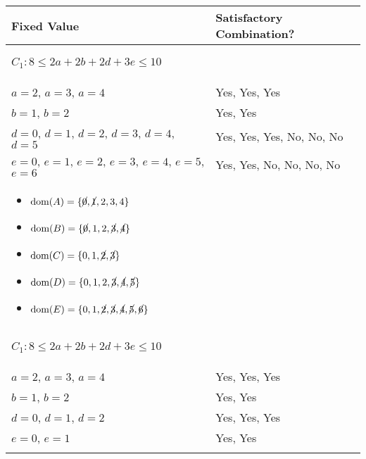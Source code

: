 \begin{example}
    \begin{center}
        \begin{tabular}{ll}
            \textbf{Fixed Value} & \textbf{Satisfactory Combination?} \\
            \toprule
            \multicolumn{2}{p{\linewidth}}{
            \begin{center}
                $C_1: 8 \leq 2a + 2b + 2d + 3e \leq 10$
            \end{center}} \\
            \midrule
                $a=2$, $a=3$, $a=4$ & Yes, Yes, Yes \\
                $b=1$, $b=2$ & Yes, Yes \\
                $d=0$, $d=1$, $d=2$, $d=3$, $d=4$, $d=5$ & Yes, Yes, Yes, No, No, No \\
                $e=0$, $e=1$, $e=2$, $e=3$, $e=4$, $e=5$, $e=6$ & Yes, Yes, No, No, No, No \\
            \multicolumn{2}{p{\linewidth}}{
            \begin{itemize}
                \item $\text{dom}(A) = \{\cancel{0}, \cancel{1}, 2, 3, 4\}$
                \item $\text{dom}(B) = \{\cancel{0}, 1, 2, \cancel{3}, \cancel{4}\} $
                \item $\text{dom}(C) = \{0, 1, \cancel{2}, \cancel{3}\} $
                \item $\text{dom}(D) = \{0, 1, 2, \cancel{3}, \cancel{4}, \cancel{5}\} $
                \item $\text{dom}(E) = \{0, 1, \cancel{2}, \cancel{3}, \cancel{4}, \cancel{5}, \cancel{6}\} $
            \end{itemize}} \\
            \midrule
            \multicolumn{2}{p{\linewidth}}{
            \begin{center}
                $C_1: 8 \leq 2a + 2b + 2d + 3e \leq 10$
            \end{center}} \\
            \midrule
                $a=2$, $a=3$, $a=4$ & Yes, Yes, Yes \\
                $b=1$, $b=2$ & Yes, Yes \\
                $d=0$, $d=1$, $d=2$ & Yes, Yes, Yes\\
                $e=0$, $e=1$ & Yes, Yes \\
            \multicolumn{2}{p{\linewidth}}{
}
\end{tabular}
\end{center}
\end{example}
